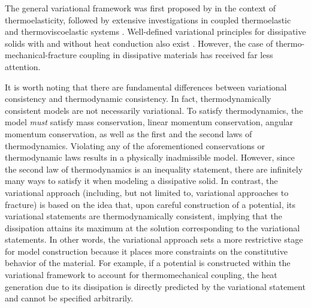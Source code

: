 The general variational framework was first proposed by \citet{biot1956thermoelasticity} in the context of thermoelasticity, followed by extensive investigations in coupled thermoelastic and thermoviscoelastic systems \cite{herrmann1963variational,ben1965variational,oden2012variational,molinari1987global,batra1989principle,matsubara2021variationally}. Well-defined variational principles for dissipative solids with and without heat conduction also exist \cite{ortiz_1999,yang2006variational}. However, the case of thermo-mechanical-fracture coupling in dissipative materials has received far less attention.

It is worth noting that there are fundamental differences between variational consistency and thermodynamic consistency. In fact, thermodynamically consistent models are not necessarily variational. To satisfy thermodynamics, the model \emph{must} satisfy mass conservation, linear momentum conservation, angular momentum conservation, as well as the first and the second laws of thermodynamics. Violating any of the aforementioned conservations or thermodynamic laws results in a physically inadmissible model. However, since the second law of thermodynamics is an inequality statement, there are infinitely many ways to satisfy it when modeling a dissipative solid. In contrast, the variational approach (including, but not limited to, variational approaches to fracture) is based on the idea that, upon careful construction of a potential, its variational statements are thermodynamically consistent, implying that the dissipation attains its maximum at the solution corresponding to the variational statements. In other words, the variational approach sets a more restrictive stage for model construction because it places more constraints on the constitutive behavior of the material. For example, if a potential is constructed within the variational framework to account for thermomechanical coupling, the heat generation due to its dissipation is directly predicted by the variational statement and cannot be specified arbitrarily.

